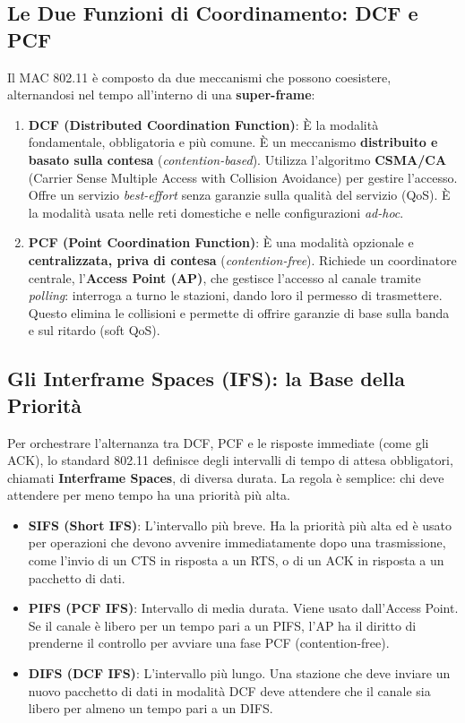\subsection{Le Due Funzioni di Coordinamento: DCF e PCF}
Il MAC 802.11 è composto da due meccanismi che possono coesistere, alternandosi nel tempo all'interno di una \textbf{super-frame}:
\begin{enumerate}
    \item \textbf{DCF (Distributed Coordination Function)}: È la modalità fondamentale, obbligatoria e più comune. È un meccanismo \textbf{distribuito e basato sulla contesa} (\textit{contention-based}). Utilizza l'algoritmo \textbf{CSMA/CA} (Carrier Sense Multiple Access with Collision Avoidance) per gestire l'accesso. Offre un servizio \textit{best-effort} senza garanzie sulla qualità del servizio (QoS). È la modalità usata nelle reti domestiche e nelle configurazioni \textit{ad-hoc}.
    \item \textbf{PCF (Point Coordination Function)}: È una modalità opzionale e \textbf{centralizzata, priva di contesa} (\textit{contention-free}). Richiede un coordinatore centrale, l'\textbf{Access Point (AP)}, che gestisce l'accesso al canale tramite \textit{polling}: interroga a turno le stazioni, dando loro il permesso di trasmettere. Questo elimina le collisioni e permette di offrire garanzie di base sulla banda e sul ritardo (soft QoS).
\end{enumerate}

\subsection{Gli Interframe Spaces (IFS): la Base della Priorità}
Per orchestrare l'alternanza tra DCF, PCF e le risposte immediate (come gli ACK), lo standard 802.11 definisce degli intervalli di tempo di attesa obbligatori, chiamati \textbf{Interframe Spaces}, di diversa durata. La regola è semplice: chi deve attendere per meno tempo ha una priorità più alta.
\begin{itemize}
    \item \textbf{SIFS (Short IFS)}: L'intervallo più breve. Ha la priorità più alta ed è usato per operazioni che devono avvenire immediatamente dopo una trasmissione, come l'invio di un CTS in risposta a un RTS, o di un ACK in risposta a un pacchetto di dati.
    \item \textbf{PIFS (PCF IFS)}: Intervallo di media durata. Viene usato dall'Access Point. Se il canale è libero per un tempo pari a un PIFS, l'AP ha il diritto di prenderne il controllo per avviare una fase PCF (contention-free).
    \item \textbf{DIFS (DCF IFS)}: L'intervallo più lungo. Una stazione che deve inviare un nuovo pacchetto di dati in modalità DCF deve attendere che il canale sia libero per almeno un tempo pari a un DIFS.
\end{itemize}

